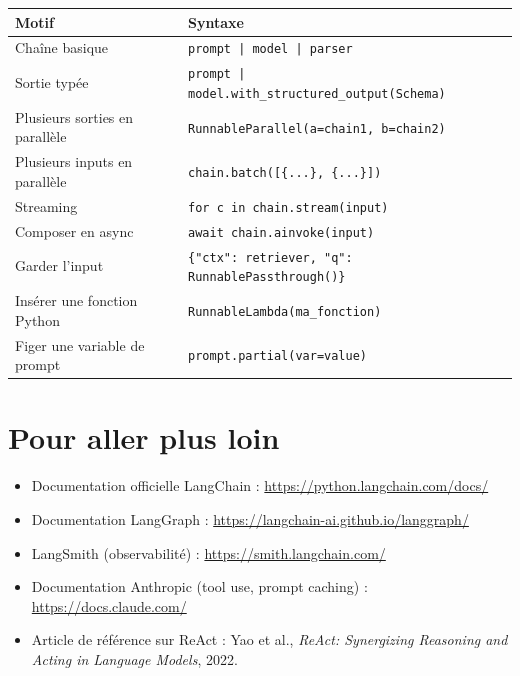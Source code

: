 \documentclass[11pt,a4paper]{article}
\begin{document}
\begin{center}
\begin{tabular}{p{6cm}p{8cm}}
\toprule
\textbf{Motif} & \textbf{Syntaxe} \\
\midrule
Chaîne basique & \texttt{prompt | model | parser} \\
Sortie typée & \texttt{prompt | model.with\_structured\_output(Schema)} \\
Plusieurs sorties en parallèle & \texttt{RunnableParallel(a=chain1, b=chain2)} \\
Plusieurs inputs en parallèle & \texttt{chain.batch([\{...\}, \{...\}])} \\
Streaming & \texttt{for c in chain.stream(input)} \\
Composer en async & \texttt{await chain.ainvoke(input)} \\
Garder l'input & \texttt{\{"ctx": retriever, "q": RunnablePassthrough()\}} \\
Insérer une fonction Python & \texttt{RunnableLambda(ma\_fonction)} \\
Figer une variable de prompt & \texttt{prompt.partial(var=value)} \\
\bottomrule
\end{tabular}
\end{center}

\section{Pour aller plus loin}

\begin{itemize}
  \item Documentation officielle LangChain : \url{https://python.langchain.com/docs/}
  \item Documentation LangGraph : \url{https://langchain-ai.github.io/langgraph/}
  \item LangSmith (observabilité) : \url{https://smith.langchain.com/}
  \item Documentation Anthropic (tool use, prompt caching) : \url{https://docs.claude.com/}
  \item Article de référence sur ReAct : Yao et al., \emph{ReAct: Synergizing Reasoning and Acting in Language Models}, 2022.
\end{itemize}
\end{document}
